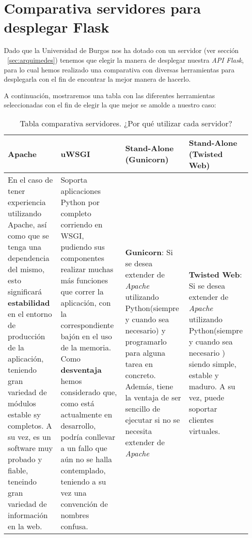\section{Comparativa servidores para desplegar Flask}\label{sec:comparativa-servidores}
Dado que la Universidad de Burgos nos ha dotado con un servidor (ver sección ~\ref{sec:arquimedes}) tenemos que elegir la manera de desplegar nuestra \textit{API Flask}, para lo cual hemos realizado una comparativa con diversas herramientas para desplegarla con el fin de encontrar la mejor manera de hacerlo.

A continuación, mostraremos una tabla con las diferentes herramientas seleccionadas con el fin de elegir la que mejor se amolde a nuestro caso:

\begin{landscape}
	\begin{table}
		\centering
		\caption{Tabla comparativa servidores. ¿Por qué utilizar cada servidor?}
		\label{serverTable}
		\begin{tabular}{p{5cm} p{5cm} p{5cm} p{5cm}}
			\toprule
			\textbf{Apache} & \textbf{uWSGI} & \textbf{Stand-Alone (Gunicorn)} & \textbf{Stand-Alone (Twisted Web)} \\
			\midrule
			En el caso de tener experiencia utilizando Apache, así como que se tenga una dependencia del mismo, esto significará \textbf{estabilidad} en el entorno de producción de la aplicación, teniendo gran variedad de módulos estable sy completos. A su vez, es un software muy probado y fiable, teneindo gran variedad de información en la web. & Soporta aplicaciones Python por completo corriendo en WSGI, pudiendo sus componentes realizar muchas más funciones que correr la aplicación, con la correspondiente bajón en el uso de la memoria. Como \textbf{desventaja} hemos considerado que, como está actualmente en desarrollo, podría conllevar a un fallo que aún no se halla contemplado, teniendo a su vez una convención de nombres confusa. & \textbf{Gunicorn}: Si se desea extender de \textit{Apache} utilizando Python(siempre y cuando sea necesario) y programarlo para alguna tarea en concreto. Además, tiene la ventaja de ser sencillo de ejecutar si no se necesita extender de \textit{Apache} & \textbf{Twisted Web}: Si se desea extender de \textit{Apache} utilizando Python(siempre y cuando sea necesario ) siendo simple, estable y maduro. A su vez, puede soportar clientes virtuales.\\
			\bottomrule
		\end{tabular}
	\end{table}
\end{landscape}

